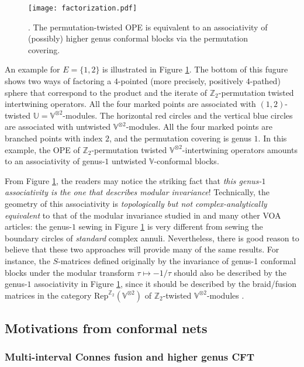 \documentclass[12pt,a4paper,notitlepage]{article}
\theoremstyle{definition}
\theoremstyle{plain}
\newcommand{\Rep}{\mathrm{Rep}}
\newcommand{\Vbb}{\mathbb V}
\newcommand{\Ubb}{\mathbb U}
\newcommand{\Zbb}{\mathbb Z}
\numberwithin{equation}{subsection}
\begin{document}
\begin{figure}[h]
	\centering
	\texttt{[image: factorization.pdf]}
	\caption{. The permutation-twisted OPE is equivalent to an associativity of  (possibly) higher genus conformal blocks via the permutation covering.}
	\label{fig2}
\end{figure}


An example for $E=\{1,2\}$ is illustrated in Figure \ref{fig2}. The bottom of this fugure shows two ways of factoring a $4$-pointed (more precisely, positively $4$-pathed) sphere that correspond to the product and the iterate of $\Zbb_2$-permutation twisted intertwining operators. All the four marked points are associated with $(1,2)$-twisted $\Ubb=\Vbb^{\otimes 2}$-modules. The horizontal red circles and the vertical blue circles are associated with  untwisted $\Vbb^{\otimes 2}$-modules. All the four marked points are branched points with index $2$, and the permutation covering is genus $1$. In this example, the OPE of $\Zbb_2$-permutation twisted $\Vbb^{\otimes 2}$-intertwining operators amounts to an associativity of genus-$1$ untwisted $\Vbb$-conformal blocks. 

From Figure \ref{fig2}, the readers may notice the striking fact that \emph{this genus-$1$ associativity is the one that describes modular invariance}! Technically, the geometry of this associativity is \emph{topologically but not complex-analytically equivalent} to that of the modular invariance studied in \cite{Zhu96,Miy04,Hua05} and many other VOA articles: the genus-$1$ sewing in Figure \ref{fig2} is very different from sewing the boundary circles of \emph{standard} complex annuli. Nevertheless, there is good reason to believe that these two approaches will provide many of the same results. For instance, the $S$-matrices  defined originally by the invariance of genus-1 conformal blocks under the modular transform $\tau\mapsto -1/\tau$ should also be described by the genus-$1$ associativity in Figure \ref{fig2}, since it should be described by the braid/fusion matrices in the category $\Rep^{\Zbb_2}(\Vbb^{\otimes 2})$ of $\Zbb_2$-twisted $\Vbb^{\otimes 2}$-modules \cite{LX19}.


\subsection{Motivations from conformal nets}


\subsubsection*{Multi-interval Connes fusion and higher genus CFT}
\end{document}
